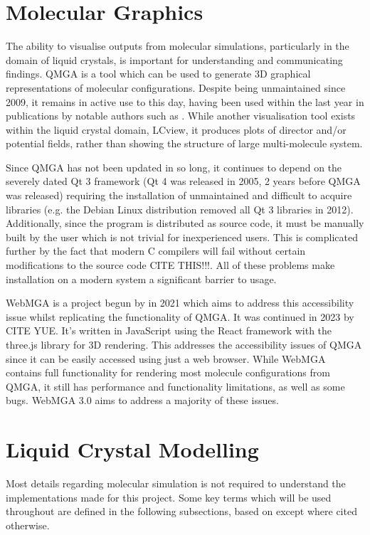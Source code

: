 \section{Molecular Graphics}
The ability to visualise outputs from molecular simulations, particularly in the domain of liquid crystals, is important for understanding and communicating findings. QMGA\cite{gabriel2008molecular} is a tool which can be used to generate 3D graphical representations of molecular configurations. Despite being unmaintained since 2009\cite{qmga_release}, it remains in active use to this day, having been used within the last year in publications by notable authors such as \textcite{ramirez2023densest,mazzilli2023phase}. While another visualisation tool exists within the liquid crystal domain, LCview\cite{james2006finite,LCview}, it produces plots of director and/or potential fields, rather than showing the structure of large multi-molecule system.

Since QMGA has not been updated in so long, it continues to depend on the severely dated Qt 3 framework (Qt 4 was released in 2005, 2 years before QMGA was released) requiring the installation of unmaintained and difficult to acquire libraries (e.g. the Debian Linux distribution removed all Qt 3 libraries in 2012\cite{qt3_removed}). Additionally, since the program is distributed as source code, it must be manually built by the user which is not trivial for inexperienced users. This is complicated further by the fact that modern C compilers will fail without certain modifications to the source code CITE THIS!!!. All of these problems make installation on a modern system a significant barrier to usage.

WebMGA is a project begun by \textcite{Battistini_2021} in 2021 which aims to address this accessibility issue whilst replicating the functionality of QMGA. It was continued in 2023 by CITE YUE. It's written in JavaScript using the React framework with the three.js library for 3D rendering. This addresses the accessibility issues of QMGA since it can be easily accessed using just a web browser. While WebMGA contains full functionality for rendering most molecule configurations from QMGA, it still has performance and functionality limitations, as well as some bugs. WebMGA 3.0 aims to address a majority of these issues.

\section{Liquid Crystal Modelling}
Most details regarding molecular simulation is not required to understand the implementations made for this project. Some key terms which will be used throughout are defined in the following subsections, based on \textcite{allen2017computer} except where cited otherwise.

